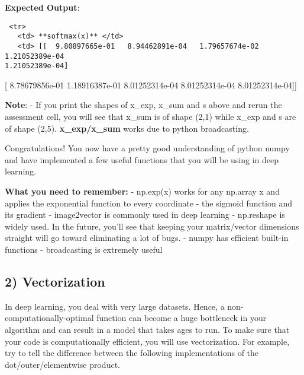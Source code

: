 \documentclass[11pt]{article}
\begin{document}
    \textbf{Expected Output}:

\begin{verbatim}
 <tr> 
   <td> **softmax(x)** </td> 
   <td> [[  9.80897665e-01   8.94462891e-04   1.79657674e-02   1.21052389e-04
1.21052389e-04]
\end{verbatim}

{[} 8.78679856e-01 1.18916387e-01 8.01252314e-04 8.01252314e-04
8.01252314e-04{]}{]}

    \textbf{Note}: - If you print the shapes of x\_exp, x\_sum and s above
and rerun the assessment cell, you will see that x\_sum is of shape
(2,1) while x\_exp and s are of shape (2,5). \textbf{x\_exp/x\_sum}
works due to python broadcasting.

Congratulations! You now have a pretty good understanding of python
numpy and have implemented a few useful functions that you will be using
in deep learning.

     \textbf{What you need to remember:} - np.exp(x) works for any np.array
x and applies the exponential function to every coordinate - the sigmoid
function and its gradient - image2vector is commonly used in deep
learning - np.reshape is widely used. In the future, you'll see that
keeping your matrix/vector dimensions straight will go toward
eliminating a lot of bugs. - numpy has efficient built-in functions -
broadcasting is extremely useful

    \subsection{2) Vectorization}\label{vectorization}

    In deep learning, you deal with very large datasets. Hence, a
non-computationally-optimal function can become a huge bottleneck in
your algorithm and can result in a model that takes ages to run. To make
sure that your code is computationally efficient, you will use
vectorization. For example, try to tell the difference between the
following implementations of the dot/outer/elementwise product.
\end{document}
